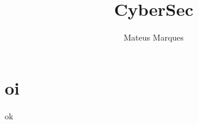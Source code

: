 \documentclass[a4paper,12pt]{article}
\title{\Huge{\textbf{CyberSec}}}
\author{Mateus Marques}
\begin{document}
\maketitle

\section{oi}

ok


%
%
\end{document}
